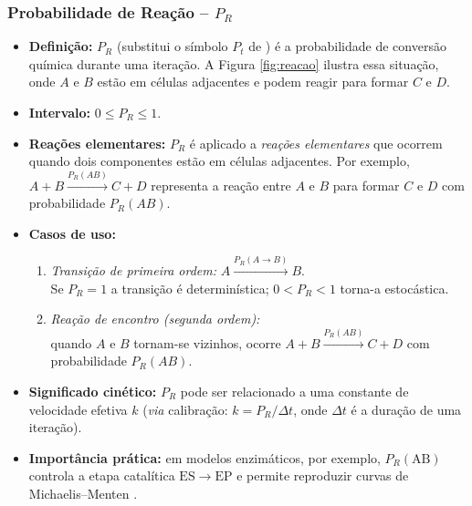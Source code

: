 \documentclass[12pt,oneside]{report}
\begin{document}
\subsubsection{Probabilidade de Reação – \texorpdfstring{$P_R$}{Pr}}
\label{subsubsec:Pr}

\begin{itemize}
    \item \textbf{Definição:} $P_R$ (substitui o símbolo $P_t$ de
          \citeauthor{kier2005}) é a probabilidade de conversão química
          durante uma iteração. A Figura \ref{fig:reacao} ilustra essa situação, onde $A$ e $B$ estão em células adjacentes e podem reagir para formar $C$ e $D$.
    \item \textbf{Intervalo:} $0 \le P_R \le 1$.
    \item \textbf{Reações elementares:} $P_R$ é aplicado a
          \emph{reações elementares} que ocorrem quando
          dois componentes estão em células adjacentes.
          Por exemplo, $A+B \xrightarrow{P_R(AB)} C+D$
          representa a reação entre $A$ e $B$ para formar $C$ e $D$ com probabilidade $P_R(AB)$.
    \item \textbf{Casos de uso:}
          \begin{enumerate}
              \item \emph{Transição de primeira ordem:}
                    $A \xrightarrow{P_R(A\rightarrow B)} B$.\\
                    Se $P_R=1$ a transição é determinística;
                    $0<P_R<1$ torna-a estocástica.
              \item \emph{Reação de encontro (segunda ordem):}\\
                    quando $A$ e $B$ tornam-se vizinhos,
                    ocorre $A+B \xrightarrow{P_R(AB)} C+D$
                    com probabilidade $P_R(AB)$.
          \end{enumerate}
    \item \textbf{Significado cinético:} $P_R$ pode ser relacionado a
          uma constante de velocidade efetiva $k$
          (\textit{via} calibração: $k = P_R/\Delta t$,
          onde $\Delta t$ é a duração de uma iteração).
    \item \textbf{Importância prática:}
          em modelos enzimáticos, por exemplo, $P_R(\mathrm{AB})$
          controla a etapa catalítica $\mathrm{ES}\rightarrow\mathrm{EP}$
          e permite reproduzir curvas de Michaelis–Menten
          \cite[cap.~9]{kier2005}.
\end{itemize}
\end{document}
